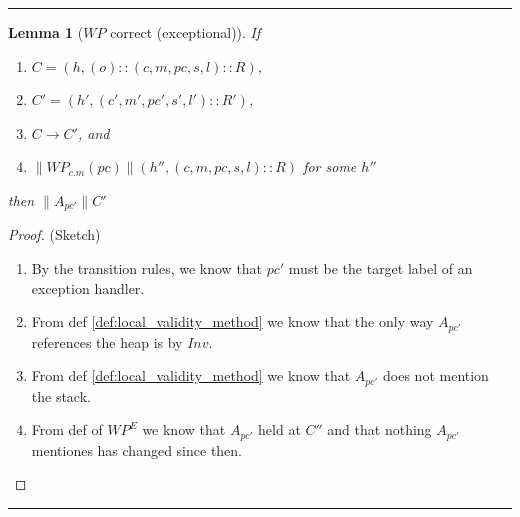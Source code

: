 \documentclass[a4paper,11pt]{article}
\newtheorem{lemma}{Lemma}
\newcommand{\Inv}{\mathit{Inv}}
\newcommand{\pc}{\mathit{pc}}
\newcommand{\WP}{\mathit{WP}}
\newcommand{\sect}[1]{\noindent\parbox{\textwidth}{#1}}
\newcommand{\sep}{\hspace{-1.5707965cm}\rule{\paperwidth}{1pt}}
\begin{document}
\sep


\sect{\begin{lemma}[$\WP$ correct (exceptional)]\label{lem:wp_correct_exceptional}
If
\begin{enumerate}
  \item $C = (h, (o)::(c, m, \pc, s, l)::R)$,
  \item $C' = (h', (c', m', \pc', s', l')::R')$,
  \item $C \rightarrow C'$, and
  \item $\|\WP_{c.m}(\pc) \| (h'', (c, m, \pc, s, l)::R)$ for some $h''$
\end{enumerate}
then $\| A_{\pc'} \| C'$
\end{lemma}
\begin{proof}(Sketch)
\begin{enumerate}
\item By the transition rules, we know that $\pc'$ must be the target label of an exception handler.
\item From def \ref{def:local_validity_method} we know that the only way $A_{\pc'}$ references the heap is by $\Inv$.
\item From def \ref{def:local_validity_method} we know that $A_{\pc'}$ does not mention the stack.
\item From def of $\WP^E$ we know that $A_{\pc'}$ held at $C''$ and that nothing $A_{\pc'}$ mentiones has changed since then.
\end{enumerate}
\end{proof}}

\sep

\newpage

\end{document}
